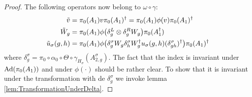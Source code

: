 \documentclass[12pt,a4paper,twoside]{article}
\let\originalleft\left
\let\originalright\right
\renewcommand{\left}{\mathopen{}\mathclose\bgroup\originalleft}
\renewcommand{\right}{\aftergroup\egroup\originalright}
\newcommand{\Ad}[1]{\textrm{Ad}\left(#1\right)}
\theoremstyle{definition}
\numberwithin{equation}{section}
\begin{document}
\begin{proof}
	The following operators now belong to $\omega\circ\gamma:$
	\begin{align}
		\tilde{v}&=\pi_0(A_1)v\pi_0(A_1)^\dagger=\pi_0(A_1)\phi(v)\pi_0(A_1)^\dagger\\
		\tilde{W}_g&=\pi_0(A_1)\phi\left(\delta^L_g\otimes\delta^R_g W_g\right)\pi_0(A_1^\dagger)\\
		\tilde u_\sigma(g,h)&=\pi_0(A_1) \phi\left(\delta^\sigma_g W_g\delta^\sigma_h W_g^\dagger u_\sigma(g,h)(\delta^\sigma_{gh})^\dagger\right)\pi_0(A_1)^\dagger
	\end{align}
	where $\delta^\sigma_g=\pi_0\circ\alpha_0\circ\Theta\circ\gamma_{H_\sigma}(A^\sigma_{2,g}).$ The fact that the index is invariant under $\Ad{\pi_0(A_1)}$ and under $\phi(\cdot)$ should be rather clear. To show that it is invariant under the transformation with de $\delta^\sigma_g$ we invoke lemma \ref{lem:TransformationUnderDelta}.
\end{proof}


\end{document}
